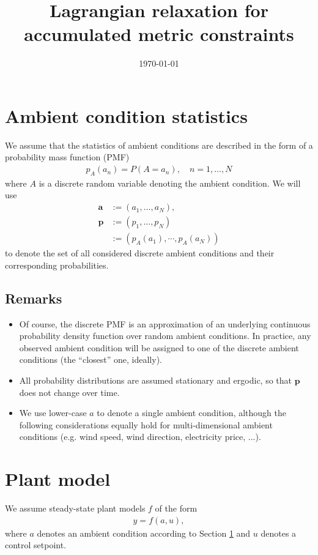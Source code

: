 \documentclass{article}
\title{Lagrangian relaxation for accumulated metric constraints}
\date{\today} %
\begin{document}
\maketitle
\tableofcontents
\section{Ambient condition statistics}\label{sec:ambient}
We assume that the statistics of ambient conditions are described in the form of a probability mass function (PMF)
\begin{align}
    p_A(a_n) = P(A=a_n),\quad n = 1, \dots, N
\end{align}
where $A$ is a discrete random variable denoting the ambient condition. We will use
\begin{align}
    \boldsymbol{a} &:= (a_1, \dots, a_N),\\
    \boldsymbol{p} &:= (p_1, \dots, p_N)\nonumber\\
                   &:= (p_A(a_1), \cdots, p_A(a_N))
\end{align}
to denote the set of all considered discrete ambient conditions and their corresponding probabilities.

\subsection*{Remarks}
\begin{itemize}
    \item Of course, the discrete PMF is an approximation of an underlying continuous probability density function over random ambient conditions. In practice, any observed ambient condition will be assigned to one of the discrete ambient conditions (the ``closest'' one, ideally).
    \item All probability distributions are assumed stationary and ergodic, so that $\boldsymbol{p}$ does not change over time.
    \item We use lower-case $a$ to denote a single ambient condition, although the following considerations equally hold for multi-dimensional ambient conditions (e.g. wind speed, wind direction, electricity price, ...).
\end{itemize}

\section{Plant model}
We assume steady-state plant models $f$ of the form
\begin{align}
    y = f(a, u),
\end{align}
where $a$ denotes an ambient condition according to Section \ref{sec:ambient} and $u$ denotes a control setpoint. 
\end{document}

